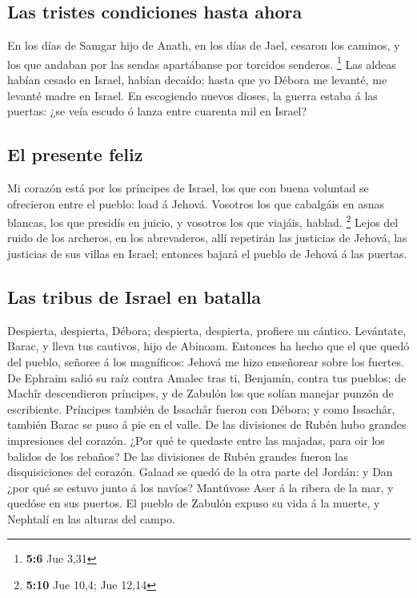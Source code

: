 \hypertarget{las-tristes-condiciones-hasta-ahora}{%
\subsection{Las tristes condiciones hasta
ahora}\label{las-tristes-condiciones-hasta-ahora}}

 En los días de Samgar hijo de Anath, en los días de Jael,
cesaron los caminos, y los que andaban por las sendas apartábanse por
torcidos senderos. \footnote{\textbf{5:6} Jue 3,31}  Las
aldeas habían cesado en Israel, habían decaído; hasta que yo Débora me
levanté, me levanté madre en Israel.  En escogiendo nuevos
dioses, la guerra estaba á las puertas: ¿se veía escudo ó lanza entre
cuarenta mil en Israel?

\hypertarget{el-presente-feliz}{%
\subsection{El presente feliz}\label{el-presente-feliz}}

 Mi corazón está por los príncipes de Israel, los que con
buena voluntad se ofrecieron entre el pueblo: load á Jehová.
 Vosotros los que cabalgáis en asnas blancas, los que
presidís en juicio, y vosotros los que viajáis, hablad. \footnote{\textbf{5:10}
  Jue 10,4; Jue 12,14}  Lejos del ruido de los archeros,
en los abrevaderos, allí repetirán las justicias de Jehová, las
justicias de sus villas en Israel; entonces bajará el pueblo de Jehová á
las puertas.

\hypertarget{las-tribus-de-israel-en-batalla}{%
\subsection{Las tribus de Israel en
batalla}\label{las-tribus-de-israel-en-batalla}}

 Despierta, despierta, Débora; despierta, despierta,
profiere un cántico. Levántate, Barac, y lleva tus cautivos, hijo de
Abinoam.  Entonces ha hecho que el que quedó del pueblo,
señoree á los magníficos: Jehová me hizo enseñorear sobre los fuertes.
 De Ephraim salió su raíz contra Amalec tras ti,
Benjamín, contra tus pueblos; de Machîr descendieron príncipes, y de
Zabulón los que solían manejar punzón de escribiente. 
Príncipes también de Issachâr fueron con Débora; y como Issachâr,
también Barac se puso á pie en el valle. De las divisiones de Rubén hubo
grandes impresiones del corazón.  ¿Por qué te quedaste
entre las majadas, para oir los balidos de los rebaños? De las
divisiones de Rubén grandes fueron las disquisiciones del corazón.
 Galaad se quedó de la otra parte del Jordán: y Dan ¿por
qué se estuvo junto á los navíos? Mantúvose Aser á la ribera de la mar,
y quedóse en sus puertos.  El pueblo de Zabulón expuso su
vida á la muerte, y Nephtalí en las alturas del campo.

